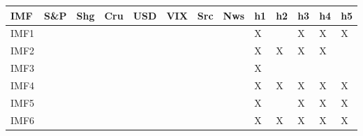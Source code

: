 {\tiny\setlength{\tabcolsep}{1pt}\begin{tabular}{lllllllllllll} \toprule
IMF & S\&P & Shg & Cru & USD & VIX & Src & Nws & h1 & h2 & h3 & h4 & h5 \\ \midrule
IMF1 & & & & & & & & X & & X & X & X \\ 
IMF2 & & & & & & & & X & X & X & X & \\ 
IMF3 & & & & & & & & X & & & & \\ 
IMF4 & & & & & & & & X & X & X & X & X \\ 
IMF5 & & & & & & & & X & & X & X & X \\ 
IMF6 & & & & & & & & X & X & X & X & X \\ 
\bottomrule \end{tabular}}